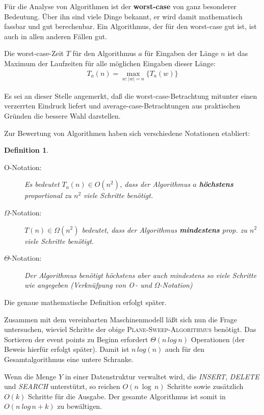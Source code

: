 \documentclass[ngerman]{scrreprt}%
\theoremstyle{break}
\newtheorem{definition}{Definition}
\begin{document}
Für die Analyse von Algorithmen ist der \textbf{worst-case} von ganz
besonderer Bedeutung. Über ihn sind viele Dinge bekannt, er wird
damit mathematisch fassbar und gut berechenbar. Ein Algorithmus,
der für den worst-case gut ist, ist auch in allen anderen Fällen gut.

Die worst-case-Zeit $T$ für den Algorithmus $a$ für Eingaben der Länge $n$
ist das Maximum der Laufzeiten für alle möglichen Eingaben dieser
Länge:
\begin{gather*}
  T_a(n) = \max_{w:|w|=n}\big\{T_a(w)\big\}
\end{gather*}

Es sei an dieser Stelle angemerkt, daß die worst-case-Betrachtung mitunter
einen verzerrten Eindruck liefert und average-case-Betrachtungen aus
praktischen Gründen die bessere Wahl darstellen.

Zur Bewertung von Algorithmen haben sich verschiedene Notationen
etabliert:
\begin{definition}
  \begin{description}
   \item[O-Notation:]
    Es bedeutet $T_a(n) \in O(n^2)$, dass der Algorithmus $a$
    \textbf{höchstens} proportional zu $n^2$ viele Schritte benötigt. 
   \item[$\Omega$-Notation:]
    $T(n) \in \Omega (n^2)$ bedeutet, dass der Algorithmus \textbf{mindestens}
    prop. zu $n^2$ viele Schritte benötigt. 
   \item[$\Theta$-Notation:]
    Der Algorithmus benötigt höchstens aber auch mindestens so viele
    Schritte wie angegeben (Verknüfpung von O$\,$- und $\Omega$-Notation)
  \end{description}
\end{definition}
Die genaue mathematische Definition erfolgt später.

Zusammen mit dem vereinbarten
Maschinenmodell läßt sich nun die Frage untersuchen, wieviel Schritte
der obige \textsc{Plane-Sweep-Algorithmus} benötigt.
Das Sortieren der event points zu Beginn erfordert $\Theta(n\,log~n)$
Operationen (der Beweis hierfür erfolgt später). Damit ist $n\,log(n)$
auch für den Gesamtalgorithmus eine untere Schranke.

Wenn die Menge $Y$ in einer Datenstruktur verwaltet wird, die 
\textit{INSERT}, \textit{DELETE} und \textit{SEARCH} unterstützt, so
reichen $O(n\: \log\,n)$ Schritte sowie zusätzlich $O(k)$ Schritte für
die Ausgabe. Der gesamte Algorithmus ist somit in $O(n\:log\,n+k)$ zu
bewältigen.
\end{document}
